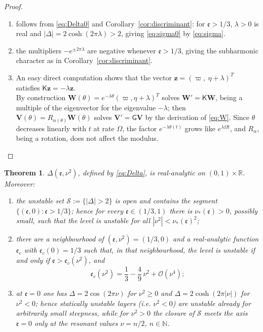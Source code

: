 \documentclass[10pt,a4paper]{amsart}
\newcommand{\Msf}{\mathsf{G}}
\newcommand{\ee}{\mathfrak{e}}
\newtheorem{theorem}{Theorem}
\begin{document}
\begin{proof}
\begin{enumerate}
    \item[(i)] follows from \eqref{eq:Delta0} and Corollary~\ref{cor:discriminant}: for $\ee>1/3$, $\lambda>0$ is real and $|\Delta|=2\cosh(2\pi\lambda)>2$, giving \eqref{eq:sigma0} by \eqref{eq:sigma}.
\item[(ii)] the multipliers $-e^{\pm2\pi\lambda}$ are negative whenever $\ee>1/3$, giving the subharmonic character as in Corollary~\ref{cor:discriminant}.
\item[(iii)] An easy direct computation shows that the vector $\mathbf{z}=(\varpi,\ \eta+\lambda)^T$ satisfies $\mathsf K\mathbf{z}=-\lambda\mathbf{z}$.\\
By construction $\mathbf W(\theta)=e^{-\lambda\theta}(\varpi,\eta+\lambda)^T$ solves $\mathbf W'=\mathsf K\mathbf W$, being a multiple of the eigenvector for the eigenvalue $-\lambda$; then $\mathbf V(\theta)=R_{\alpha(\theta)}\mathbf W(\theta)$ solves $\mathbf V'=\Msf\mathbf V$ by the derivation of \eqref{eq:W}. Since $\theta$ decreases linearly with $t$ at rate $\Omega$, the factor $e^{-\lambda\theta(t)}$ grows like $e^{\lambda\Omega t}$, and $R_\alpha$, being a rotation, does not affect the modulus.
\end{enumerate}
\end{proof}

\setcounter{theorem}{12}
\setcounter{equation}{81}
\begin{theorem}\label{prop:strat}
$\Delta(\ee,\nu^2)$, defined by \eqref{eq:Delta}, is real-analytic on $(0,1)\times\mathbb R$. Moreover:
\begin{enumerate}
\item[(i)] the unstable set $\mathcal S:=\{|\Delta|>2\}$ is open and contains the segment $\{(\ee,0):\ee>1/3\}$; hence for every $\ee\in(1/3,1)$ there is $\nu_*(\ee)>0$, possibly small, such that the level is unstable for all $|\nu^2|<\nu_*(\ee)^2$;
\item[(ii)] there are a neighbourhood of $(\ee,\nu^2)=(1/3,0)$ and a real-analytic function $\ee_c$ with $\ee_c(0)=1/3$ such that, in that neighbourhood, the level is unstable if and only if $\ee>\ee_c(\nu^2)$, and
\begin{equation}\label{eq:ec}
\ee_c(\nu^2)=\frac{1}{3}-\frac{4}{9}\,\nu^2+\mathcal{O}(\nu^4);
\end{equation}
\item[(iii)] at $\ee=0$ one has $\Delta=2\cos(2\pi\nu)$ for $\nu^2\ge0$ and $\Delta=2\cosh(2\pi|\nu|)$ for $\nu^2<0$; hence statically unstable layers (i.e. $\nu^2<0$) are unstable already for arbitrarily small steepness, while for $\nu^2>0$ the closure of $\mathcal S$ meets the axis $\ee=0$ only at the resonant values $\nu=n/2$, $n\in\mathbb N$.
\end{enumerate}
\end{theorem}
\end{document}
